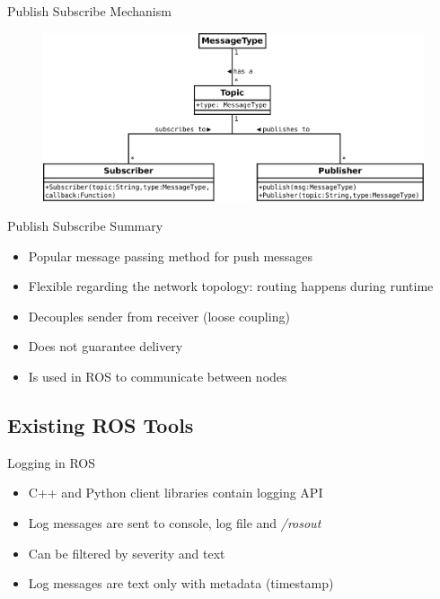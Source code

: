 \documentclass[compress]{beamer}
\begin{document}
\begin{frame}{Publish Subscribe Mechanism}
\begin{figure}[t]
    \centering
    \includegraphics[width=\textwidth]{diagrams/ros_pubsub}
\end{figure}
\end{frame}

\begin{frame}{Publish Subscribe Summary}
\begin{itemize}
\item Popular message passing method for push messages
\item Flexible regarding the network topology: routing happens during runtime
\item Decouples sender from receiver (loose coupling)
\item Does not guarantee delivery
\item Is used in ROS to communicate between nodes
\end{itemize}
\end{frame}

\subsection{Existing ROS Tools}

\begin{frame}{Logging in ROS}
\begin{itemize}
\item C++ and Python client libraries contain logging API
\item Log messages are sent to console, log file and \emph{/rosout}
\item Can be filtered by severity and text
\item Log messages are text only with metadata (timestamp)
\end{itemize}
\end{frame}
\end{document}
